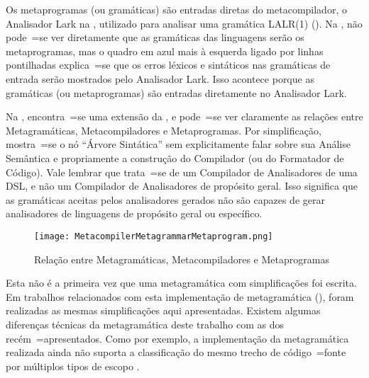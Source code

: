 Os metaprogramas (ou gramáticas) são entradas diretas do metacompilador,
o Analisador Lark na ,
utilizado para analisar uma gramática LALR(1) ().
Na ,
não pode~=se ver diretamente que as gramáticas das linguagens serão os metaprogramas,
mas o quadro em azul mais à esquerda ligado por linhas pontilhadas explica~=se que os erros léxicos e
sintáticos nas gramáticas de entrada serão mostrados pelo Analisador Lark.
Isso acontece porque as gramáticas (ou metaprogramas) são entradas diretamente no Analisador Lark.

Na ,
encontra~=se uma extensão da ,
e pode~=se ver claramente as relações entre Metagramáticas,
Metacompiladores e Metaprogramas. Por simplificação,
mostra~=se o nó ``Árvore Sintática'' sem explicitamente falar sobre sua Análise Semântica e
propriamente a construção do Compilador (ou do Formatador de Código).
Vale lembrar que trata~=se de um Compilador de Analisadores de uma DSL,
e não um Compilador de Analisadores de propósito geral.
Isso significa que as gramáticas aceitas pelos analisadores gerados não são capazes de gerar analisadores de linguagens de propósito geral ou
específico.
\begin{figure}[!htb]
\caption{Relação entre Metagramáticas, Metacompiladores e Metaprogramas}
\label{figure:MetacompilerMetagrammarMetaprogram}
\centering
\texttt{[image: MetacompilerMetagrammarMetaprogram.png]}
\end{figure}

Esta não é a primeira vez que uma metagramática com simplificações foi escrita.
Em trabalhos relacionados com esta implementação de metagramática (),
foram realizadas as mesmas simplificações aqui apresentadas.
Existem algumas diferenças técnicas da metagramática deste trabalho com as dos recém~=apresentados.
Como por exemplo,
a implementação da metagramática realizada ainda não suporta a classificação do mesmo trecho de código~=fonte por múltiplos tipos de escopo \cite{vsCodeSyntaxHighlighthing}.

